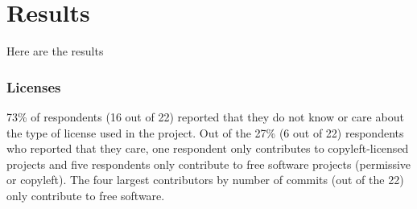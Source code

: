 \section{Results}

Here are the results

\subsubsection{Licenses}

73\% of respondents (16 out of 22) reported that they do not know or care about the type of license used in the project. Out of the 27\% (6 out of 22) respondents who reported that they care, one respondent only contributes to copyleft-licensed projects and five respondents only contribute to free software projects (permissive or copyleft). The four largest contributors by number of commits (out of the 22) only contribute to free software.